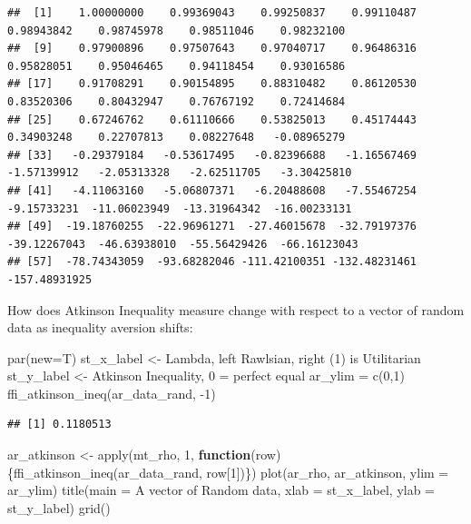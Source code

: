 \documentclass[
]{book}
\newenvironment{Shaded}{\begin{snugshade}}{\end{snugshade}}
\newcommand{\AttributeTok}[1]{\textcolor[rgb]{0.77,0.63,0.00}{#1}}
\newcommand{\ControlFlowTok}[1]{\textcolor[rgb]{0.13,0.29,0.53}{\textbf{#1}}}
\newcommand{\DecValTok}[1]{\textcolor[rgb]{0.00,0.00,0.81}{#1}}
\newcommand{\FunctionTok}[1]{\textcolor[rgb]{0.00,0.00,0.00}{#1}}
\newcommand{\NormalTok}[1]{#1}
\newcommand{\OtherTok}[1]{\textcolor[rgb]{0.56,0.35,0.01}{#1}}
\newcommand{\SpecialCharTok}[1]{\textcolor[rgb]{0.00,0.00,0.00}{#1}}
\newcommand{\StringTok}[1]{\textcolor[rgb]{0.31,0.60,0.02}{#1}}
\begin{document}
\begin{verbatim}
##  [1]    1.00000000    0.99369043    0.99250837    0.99110487    0.98943842    0.98745978    0.98511046    0.98232100
##  [9]    0.97900896    0.97507643    0.97040717    0.96486316    0.95828051    0.95046465    0.94118454    0.93016586
## [17]    0.91708291    0.90154895    0.88310482    0.86120530    0.83520306    0.80432947    0.76767192    0.72414684
## [25]    0.67246762    0.61110666    0.53825013    0.45174443    0.34903248    0.22707813    0.08227648   -0.08965279
## [33]   -0.29379184   -0.53617495   -0.82396688   -1.16567469   -1.57139912   -2.05313328   -2.62511705   -3.30425810
## [41]   -4.11063160   -5.06807371   -6.20488608   -7.55467254   -9.15733231  -11.06023949  -13.31964342  -16.00233131
## [49]  -19.18760255  -22.96961271  -27.46015678  -32.79197376  -39.12267043  -46.63938010  -55.56429426  -66.16123043
## [57]  -78.74343059  -93.68282046 -111.42100351 -132.48231461 -157.48931925
\end{verbatim}

How does Atkinson Inequality measure change with respect to a vector of random data as inequality aversion shifts:

\begin{Shaded}
\begin{Highlighting}[]
\FunctionTok{par}\NormalTok{(}\AttributeTok{new=}\NormalTok{T)}
\NormalTok{st\_x\_label }\OtherTok{\textless{}{-}} \StringTok{\textquotesingle{}Lambda, left Rawlsian, right (1) is Utilitarian\textquotesingle{}}
\NormalTok{st\_y\_label }\OtherTok{\textless{}{-}} \StringTok{\textquotesingle{}Atkinson Inequality, 0 = perfect equal\textquotesingle{}}
\NormalTok{ar\_ylim }\OtherTok{=} \FunctionTok{c}\NormalTok{(}\DecValTok{0}\NormalTok{,}\DecValTok{1}\NormalTok{)}
\FunctionTok{ffi\_atkinson\_ineq}\NormalTok{(ar\_data\_rand, }\SpecialCharTok{{-}}\DecValTok{1}\NormalTok{)}
\end{Highlighting}
\end{Shaded}

\begin{verbatim}
## [1] 0.1180513
\end{verbatim}

\begin{Shaded}
\begin{Highlighting}[]
\NormalTok{ar\_atkinson }\OtherTok{\textless{}{-}} \FunctionTok{apply}\NormalTok{(mt\_rho, }\DecValTok{1}\NormalTok{, }\ControlFlowTok{function}\NormalTok{(row)\{}\FunctionTok{ffi\_atkinson\_ineq}\NormalTok{(ar\_data\_rand, row[}\DecValTok{1}\NormalTok{])\})}
\FunctionTok{plot}\NormalTok{(ar\_rho, ar\_atkinson, }\AttributeTok{ylim =}\NormalTok{ ar\_ylim)}
\FunctionTok{title}\NormalTok{(}\AttributeTok{main =} \StringTok{\textquotesingle{}A vector of Random data\textquotesingle{}}\NormalTok{, }\AttributeTok{xlab =}\NormalTok{ st\_x\_label, }\AttributeTok{ylab =}\NormalTok{ st\_y\_label)}
\FunctionTok{grid}\NormalTok{()}
\end{Highlighting}
\end{Shaded}
\end{document}
